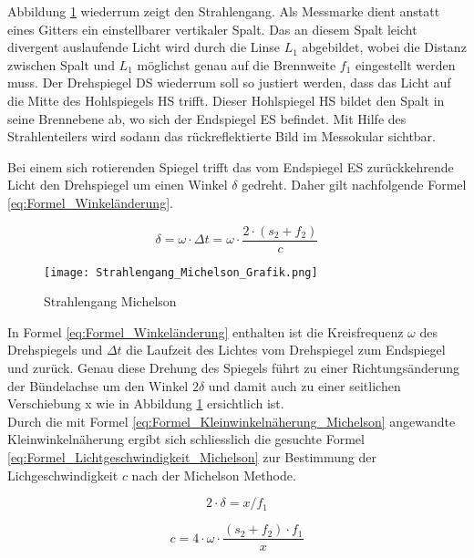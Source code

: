 Abbildung \ref{fig:Strahlengang Michelson} wiederrum zeigt den Strahlengang. Als Messmarke dient anstatt eines Gitters ein einstellbarer vertikaler Spalt. Das an diesem Spalt leicht divergent auslaufende Licht wird durch die Linse $L_{1}$ abgebildet, wobei die Distanz zwischen Spalt und $L_{1}$ möglichst genau auf die Brennweite $f_{1}$ eingestellt werden muss. Der Drehspiegel DS wiederrum soll so justiert werden, dass das Licht auf die Mitte des Hohlspiegels HS trifft. Dieser Hohlspiegel HS bildet den Spalt in seine Brennebene ab, wo sich der Endspiegel ES befindet. Mit Hilfe des Strahlenteilers wird sodann das rückreflektierte Bild im Messokular sichtbar.

Bei einem sich rotierenden Spiegel trifft das vom Endspiegel ES zurückkehrende Licht den Drehspiegel um einen Winkel $\delta$ gedreht. Daher gilt nachfolgende Formel \ref{eq:Formel_Winkeländerung}.

\begin{equation}
\delta = \omega\cdot\Delta t = \omega\cdot\dfrac{2\cdot(s_{2}+f_{2})}{c}
\label{eq:Formel_Winkeländerung}
\end{equation}

\begin{figure}[htb]
\texttt{[image: Strahlengang\_Michelson\_Grafik.png]}
\caption{Strahlengang Michelson}
\label{fig:Strahlengang Michelson}
\end{figure}

In Formel \ref{eq:Formel_Winkeländerung} enthalten ist die Kreisfrequenz $\omega$ des Drehspiegels und $\Delta t$ die Laufzeit des Lichtes vom Drehspiegel zum Endspiegel und zurück. Genau diese Drehung des Spiegels führt zu einer Richtungsänderung der Bündelachse um den Winkel $2\delta$ und damit auch zu einer seitlichen Verschiebung x wie in Abbildung \ref{fig:Strahlengang Michelson} ersichtlich ist.\\
Durch die mit Formel \ref{eq:Formel_Kleinwinkelnäherung_Michelson} angewandte Kleinwinkelnäherung ergibt sich schliesslich die gesuchte Formel \ref{eq:Formel_Lichtgeschwindigkeit_Michelson} zur Bestimmung der Lichgeschwindigkeit $c$ nach der Michelson Methode.

\begin{equation}
2\cdot\delta = x/f_{1}
\label{eq:Formel_Kleinwinkelnäherung_Michelson}
\end{equation}

\begin{equation}
c = 4\cdot\omega\cdot\dfrac{(s_{2}+f_{2})\cdot f_{1}}{x}
\label{eq:Formel_Lichtgeschwindigkeit_Michelson}
\end{equation}
